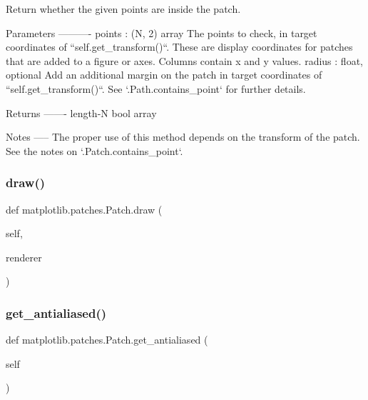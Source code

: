 \begin{DoxyVerb}Return whether the given points are inside the patch.

Parameters
----------
points : (N, 2) array
    The points to check, in target coordinates of
    ``self.get_transform()``. These are display coordinates for patches
    that are added to a figure or axes. Columns contain x and y values.
radius : float, optional
    Add an additional margin on the patch in target coordinates of
    ``self.get_transform()``. See `.Path.contains_point` for further
    details.

Returns
-------
length-N bool array

Notes
-----
The proper use of this method depends on the transform of the patch.
See the notes on `.Patch.contains_point`.
\end{DoxyVerb}
 \mbox{\label{classmatplotlib_1_1patches_1_1Patch_a058624ddc6509f54aa513078204dbf44}} 
\subsubsection{\texorpdfstring{draw()}{draw()}}
{\footnotesize\ttfamily def matplotlib.\+patches.\+Patch.\+draw (\begin{DoxyParamCaption}\item[{}]{self,  }\item[{}]{renderer }\end{DoxyParamCaption})}

\mbox{\label{classmatplotlib_1_1patches_1_1Patch_aebc8e82b39444d077c96866cbbd2a23a}} 
\subsubsection{\texorpdfstring{get\+\_\+antialiased()}{get\_antialiased()}}
{\footnotesize\ttfamily def matplotlib.\+patches.\+Patch.\+get\+\_\+antialiased (\begin{DoxyParamCaption}\item[{}]{self }\end{DoxyParamCaption})}

